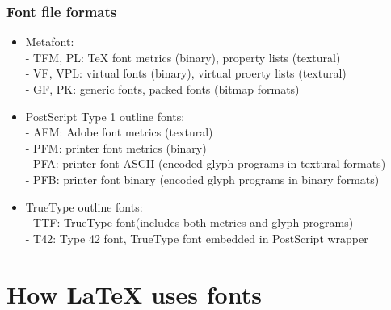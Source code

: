 \documentclass{beamer}
\begin{document}
\begin{frame}[fragile]
\frametitle{Font file formats}
\begin{itemize}
\item Metafont:\\
      \footnotesize{- TFM, PL: \TeX{} font metrics (binary), property lists (textural)\\
      - VF, VPL: virtual fonts (binary), virtual proerty lists (textural)\\
      - GF, PK: generic fonts, packed fonts (bitmap formats)}
\item \normalsize{PostScript Type 1 outline fonts:}\\
      \footnotesize{- AFM: Adobe font metrics (textural)\\
      - PFM: printer font metrics (binary)\\
      - PFA: printer font ASCII (encoded glyph programs in textural formats)\\
      - PFB: printer font binary (encoded glyph programs in binary formats)}
\item \normalsize{TrueType outline fonts:}\\
      \footnotesize{- TTF: TrueType font(includes both metrics and glyph programs)\\
      - T42: Type 42 font, TrueType font embedded in PostScript wrapper}
\end{itemize}
\end{frame}

\section{How \LaTeX{} uses fonts}
\end{document}

